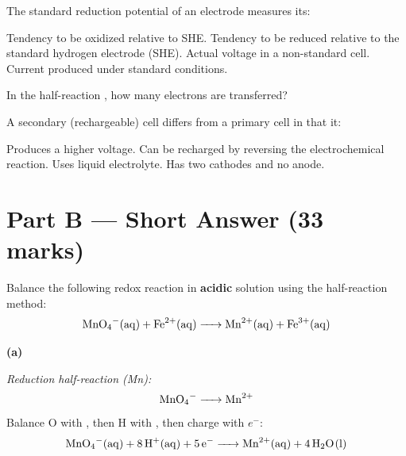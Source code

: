 \documentclass[addpoints]{exam}
\begin{document}
\begin{questions}
\question[1] The standard reduction potential of an electrode measures its:
\begin{choices}
    \choice Tendency to be oxidized relative to SHE.
    \correctchoice Tendency to be reduced relative to the standard hydrogen electrode (SHE).
    \choice Actual voltage in a non-standard cell.
    \choice Current produced under standard conditions.
\end{choices}

\question[1] In the half-reaction ,
how many electrons are transferred?
\begin{choices}
\end{choices}

\question[1] A secondary (rechargeable) cell differs from a primary cell in that it:
\begin{choices}
    \choice Produces a higher voltage.
    \correctchoice Can be recharged by reversing the electrochemical reaction.
    \choice Uses liquid electrolyte.
    \choice Has two cathodes and no anode.
\end{choices}


\section*{Part B --- Short Answer (33 marks)}

\question Balance the following redox reaction in \textbf{acidic} solution using the
half-reaction method:
\[
\ce{MnO4-(aq) + Fe^{2+}(aq) -> Mn^{2+}(aq) + Fe^{3+}(aq)}
\]
\begin{solution}[10cm]
\textbf{(a)}

\textit{Reduction half-reaction (Mn):}
\[
\ce{MnO4- -> Mn^{2+}}
\]
Balance O with , then H with , then charge with $e^-$:
\[
\ce{MnO4-(aq) + 8H+(aq) + 5e- -> Mn^{2+}(aq) + 4H2O(l)}
\]


\end{solution}
\end{questions}
\end{document}
